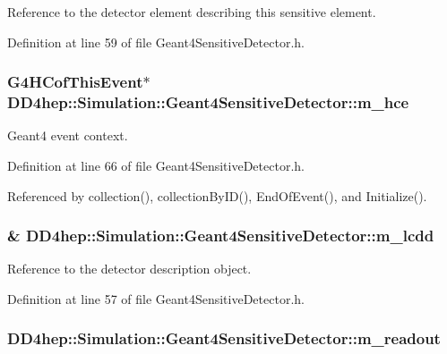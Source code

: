 Reference to the detector element describing this sensitive element. 

Definition at line 59 of file Geant4SensitiveDetector.h.\hypertarget{class_d_d4hep_1_1_simulation_1_1_geant4_sensitive_detector_abba73e5c3e4dfb26cc46bb5c165cf225}{
\subsubsection[{m\_\-hce}]{\setlength{\rightskip}{0pt plus 5cm}G4HCofThisEvent$\ast$ {\bf DD4hep::Simulation::Geant4SensitiveDetector::m\_\-hce}}}
\label{class_d_d4hep_1_1_simulation_1_1_geant4_sensitive_detector_abba73e5c3e4dfb26cc46bb5c165cf225}


Geant4 event context. 

Definition at line 66 of file Geant4SensitiveDetector.h.

Referenced by collection(), collectionByID(), EndOfEvent(), and Initialize().\hypertarget{class_d_d4hep_1_1_simulation_1_1_geant4_sensitive_detector_af2c638cb0b0a50437852cf6fb57ef7f1}{
\subsubsection[{m\_\-lcdd}]{\& {\bf DD4hep::Simulation::Geant4SensitiveDetector::m\_\-lcdd}}}
\label{class_d_d4hep_1_1_simulation_1_1_geant4_sensitive_detector_af2c638cb0b0a50437852cf6fb57ef7f1}


Reference to the detector description object. 

Definition at line 57 of file Geant4SensitiveDetector.h.\hypertarget{class_d_d4hep_1_1_simulation_1_1_geant4_sensitive_detector_a896a6c6cb7ea1a05384a0a36516da34f}{
\subsubsection[{m\_\-readout}]{ {\bf DD4hep::Simulation::Geant4SensitiveDetector::m\_\-readout}}}
\label{class_d_d4hep_1_1_simulation_1_1_geant4_sensitive_detector_a896a6c6cb7ea1a05384a0a36516da34f}



